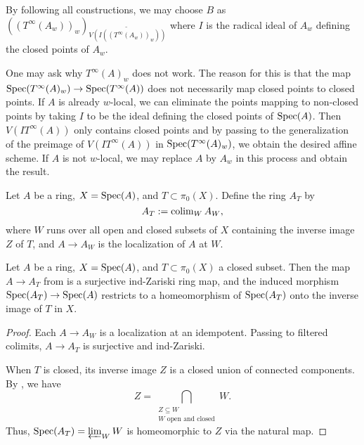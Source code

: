 \begin{remark}
    By following all constructions, we may choose $B$
    as $((T^{\infty}(A_w))_w)_{\widetilde{V(I ((T^{\infty}(A_w))_w))}}$
    where $I$ is the radical ideal of $A_w$ defining the closed points of $A_w$.

    One may ask why $T^\infty(A)_w$ does not work. The reason for this is
    that the map $\mathrm{Spec}(T^{\infty}(A)_w) \to \mathrm{Spec}(T^{\infty}(A))$ does not necessarily
    map closed points to closed points. If $A$ is already $w$-local,
    we can eliminate the points mapping to non-closed points by taking $I$ to be the ideal defining
    the closed points of $\mathrm{Spec}(A)$.
    Then $V(I T^{\infty}(A))$ only contains closed points and by
    passing to the generalization of the preimage of $V(I T^{\infty}(A))$ in
    $\mathrm{Spec}(T^{\infty}(A)_w)$, we obtain the desired affine scheme. If $A$ is not $w$-local,
    we may replace $A$ by $A_w$ in this process and obtain the result.
\end{remark}

\begin{definition}
  \label{def:colim-open-closed-localizations}
  Let $A$ be a ring, $X = \operatorname{Spec}(A)$, and $T \subset \pi_0(X)$. Define the ring $A_T$ by
  \[ 
    A_T := \operatorname{colim}_{W} A_W,
  \]
  where $W$ runs over all open and closed subsets of $X$ containing the inverse image $Z$ of $T$, and $A \to A_W$ is the localization of $A$ at $W$.
\end{definition}

\begin{lemma}
  \label{thm:colim-open-closed-localizations-surj-ind-zariski}
  Let $A$ be a ring, $X = \operatorname{Spec}(A)$, and $T \subset \pi_0(X)$ a closed subset. Then the map $A \to A_T$ from  is a surjective ind-Zariski ring map, and the induced morphism $\operatorname{Spec}(A_T) \to \operatorname{Spec}(A)$ restricts to a homeomorphism of $\operatorname{Spec}(A_T)$ onto the inverse image of $T$ in $X$.
\end{lemma}

\begin{proof}
  Each $A \to A_W$ is a localization at an idempotent. Passing to filtered colimits, $A \to A_T$ is surjective and ind-Zariski.

  When $T$ is closed, its inverse image $Z$ is a closed union of connected components. By , we have
  \[
    Z = \bigcap_{\substack{Z \subseteq W \\ W \text{ open and closed}}} W.
  \]
  Thus, $\operatorname{Spec}(A_T) = \varprojlim_W W$ is homeomorphic to $Z$ via the natural map.
\end{proof}

